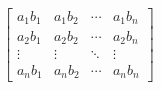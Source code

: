 \documentclass{article}
\begin{document}
    $\begin{bmatrix}a_1b_1&a_1b_2&\cdots&a_1b_n\\a_2b_1&a_2b_2&\cdots&a_2b_n\\\vdots&\vdots&\ddots&\vdots\\a_nb_1&a_nb_2&\cdots&a_nb_n\end{bmatrix}$
\end{document}
